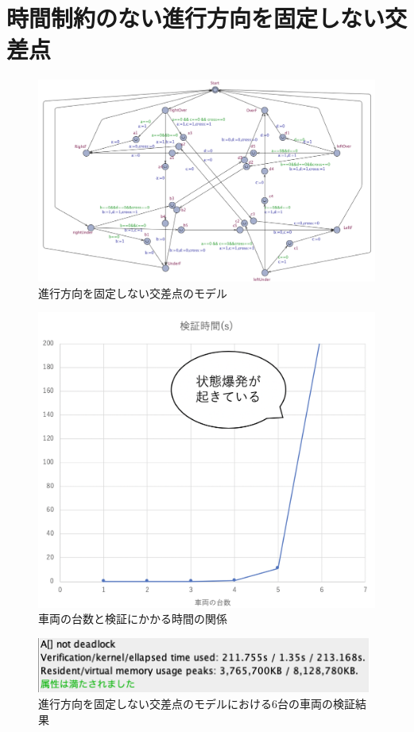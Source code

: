 \documentclass{tpu-sotu}
\begin{document}
	\section{時間制約のない進行方向を固定しない交差点}
	\begin{figure}[htbp]
	\centering
	\includegraphics[width=155mm]{IntersectionBig.png}
	\caption{進行方向を固定しない交差点のモデル}
	\label{IB}
	\end{figure}
	\begin{figure}[htbp]
	\centering
	\includegraphics[width=120mm]{IntersectionVerificationTime.png}
	\caption{車両の台数と検証にかかる時間の関係}
	\label{IVT}
	\end{figure}

	\begin{figure}[htbp]
	\centering
	\includegraphics[width=110mm]{InterBigCar6.png}
	\caption{進行方向を固定しない交差点のモデルにおける6台の車両の検証結果}
	\label{IBC6}
	\end{figure}
	\newpage
	
\end{document}
